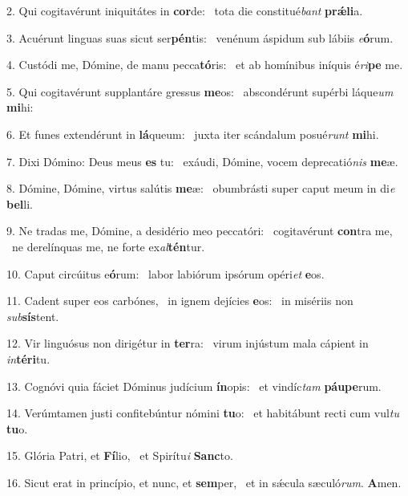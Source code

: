 2. Qui cogitavérunt iniquitátes in \textbf{cor}de: \ast\  tota die constitué\textit{bant} \textbf{prǽ}\textbf{li}a.\

3. Acuérunt linguas suas sicut ser\textbf{pén}tis: \ast\  venénum áspidum sub lábiis \textit{e}\textbf{ó}rum.\

4. Custódi me, Dómine, de manu pecca\textbf{tó}ris: \ast\  et ab homínibus iníquis é\textit{ri}\textbf{pe} me.\

5. Qui cogitavérunt supplantáre gressus \textbf{me}os: \ast\  abscondérunt supérbi láque\textit{um} \textbf{mi}hi:\

6. Et funes extendérunt in \textbf{lá}queum: \ast\  juxta iter scándalum posué\textit{runt} \textbf{mi}hi.\

7. Dixi Dómino: Deus meus \textbf{es} tu: \ast\  exáudi, Dómine, vocem deprecatió\textit{nis} \textbf{me}æ.\

8. Dómine, Dómine, virtus salútis \textbf{me}æ: \ast\  obumbrásti super caput meum in di\textit{e} \textbf{bel}li.\

9. Ne tradas me, Dómine, a desidério meo peccatóri: \dag\  cogitavérunt \textbf{con}tra me, \ast\  ne derelínquas me, ne forte ex\textit{al}\textbf{tén}tur.\

10. Caput circúitus e\textbf{ó}rum: \ast\  labor labiórum ipsórum opéri\textit{et} \textbf{e}os.\

11. Cadent super eos carbónes, \dag\  in ignem dejícies \textbf{e}os: \ast\  in misériis non \textit{sub}\textbf{sís}tent.\

12. Vir linguósus non dirigétur in \textbf{ter}ra: \ast\  virum injústum mala cápient in \textit{in}\textbf{tér}\textbf{i}tu.\

13. Cognóvi quia fáciet Dóminus judícium \textbf{ín}opis: \ast\  et vindíc\textit{tam} \textbf{páu}\textbf{pe}rum.\

14. Verúmtamen justi confitebúntur nómini \textbf{tu}o: \ast\  et habitábunt recti cum vul\textit{tu} \textbf{tu}o.\

15. Glória Patri, et \textbf{Fí}lio, \ast\  et Spirítu\textit{i} \textbf{Sanc}to.\

16. Sicut erat in princípio, et nunc, et \textbf{sem}per, \ast\  et in sǽcula sæculó\textit{rum}. \textbf{A}men.\

